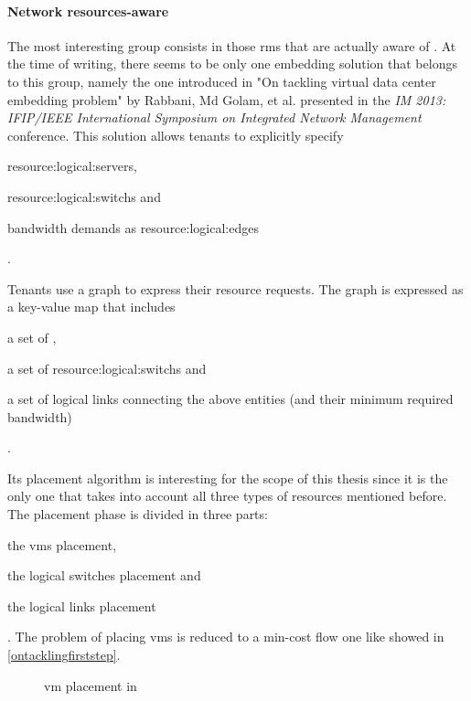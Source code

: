 \paragraph{Network resources-aware} \label{network_resources-aware_rms}
The most interesting group consists in those \glspl{rm} that are actually aware of .
At the time of writing, there seems to be only one embedding solution that belongs to this group, namely the one introduced in "On tackling virtual data center embedding problem" \cite{ontackling} by Rabbani, Md Golam, et al. presented in the \textit{IM 2013: IFIP/IEEE International Symposium on Integrated Network Management} conference.
This solution allows tenants to explicitly specify
\begin{mylist}
    \item \glspl{resource:logical:server},
    \item \glspl{resource:logical:switch} and
    \item bandwidth demands as \glspl{resource:logical:edge}
\end{mylist}.

Tenants use a graph to express their resource requests.
The graph is expressed as a key-value map that includes
\begin{mylist}
    \item a set of ,
    \item a set of \glspl{resource:logical:switch} and
    \item a set of logical links connecting the above entities (and their minimum required bandwidth)
\end{mylist}.

Its placement algorithm is interesting for the scope of this thesis since it is the only one that takes into account all three types of resources mentioned before.
The placement phase is divided in three parts:
\begin{mylist}
    \item the \glspl{vm} placement,
    \item the logical switches placement and
    \item the logical links placement
\end{mylist}.
The problem of placing \glspl{vm} is reduced to a min-cost flow one like showed in \autoref{ontacklingfirststep}.

\begin{figure}[!htb]
    \centering
    \usebox{\ontacklingfirststep}
    \caption{\gls{vm} placement in \cite{ontackling}}
    \label{ontacklingfirststep}
\end{figure}


